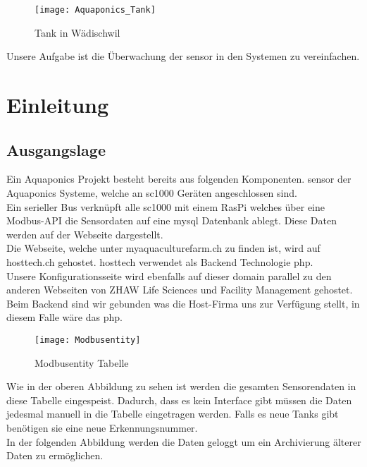 \documentclass[../main.tex]{subfiles}
\begin{document}
	
	\begin{figure}[H]
		\centering
		\texttt{[image: Aquaponics\_Tank]}
		\caption{Tank in Wädischwil}
		\label{fig:Aquaponics_Tank}
	\end{figure}
	\par \noindent
	Unsere Aufgabe ist die Überwachung der \gls{sensor} in den Systemen zu vereinfachen. \\
	
	\section{Einleitung}
	
	\subsection{Ausgangslage}
	Ein Aquaponics Projekt besteht bereits aus folgenden Komponenten. \gls{sensor} der Aquaponics Systeme, welche an \gls{sc1000} Geräten angeschlossen sind. \\
	Ein serieller Bus verknüpft alle \gls{sc1000} mit einem RasPi welches über eine Modbus-API die Sensordaten auf eine \gls{mysql} Datenbank ablegt. Diese Daten werden auf der Webseite dargestellt. \\
	Die Webseite, welche unter myaquaculturefarm.ch zu finden ist, wird auf hosttech.ch gehostet. \gls{hosttech} verwendet als Backend Technologie \gls{php}.\\
	Unsere Konfigurationsseite wird ebenfalls auf dieser \gls{domain} parallel zu den anderen Webseiten von ZHAW Life Sciences und Facility Management gehostet. \\
	Beim Backend sind wir gebunden was die Host-Firma uns zur Verfügung stellt, in diesem Falle wäre das \gls{php}.
	
	\begin{figure}[H]
		\centering
		\texttt{[image: Modbusentity]}
		\caption{Modbusentity Tabelle}
		\label{fig:Modbusentity}
	\end{figure}
	\par \noindent
	Wie in der oberen Abbildung zu sehen ist werden die gesamten Sensorendaten in diese Tabelle eingespeist. Dadurch, dass es kein Interface gibt müssen die Daten jedesmal manuell in die Tabelle eingetragen werden. Falls es neue Tanks gibt benötigen sie eine neue Erkennungsnummer.  \\
	In der folgenden Abbildung werden die Daten geloggt um ein Archivierung älterer Daten zu ermöglichen.
	
\end{document}
